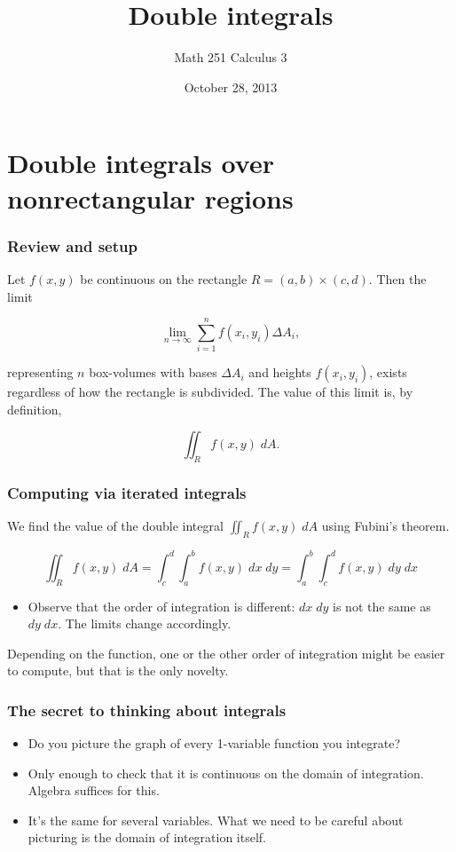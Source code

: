 \documentclass[11pt,ignorenonframetext,aspectratio=169,xcolor={svgnames}]{beamer}
\title{Double integrals}
\author{Math 251 Calculus 3}
\date{October 28, 2013}
\begin{document}
\frame{\titlepage}

\section{Double integrals over nonrectangular regions}

\begin{frame}\frametitle{Review and setup}

Let $f(x,y)$ be continuous on the rectangle $R = (a,b) \times (c,d)$.
Then the limit

\[ \lim_{n \to \infty} \sum_{i=1}^n f(x_i, y_i) \Delta A_i, \]

representing $n$ box-volumes with bases $\Delta A_i$ and heights
$f(x_i,y_i)$, exists regardless of how the rectangle is subdivided. The
value of this limit is, by definition,

\[ \iint_R f(x,y) \; dA. \]

\end{frame}

\begin{frame}\frametitle{Computing via iterated integrals}

We find the value of the double integral $\iint_R f(x,y) \; dA$ using
Fubini's theorem.

\[ \iint_R f(x,y) \; dA = \int_c^d \int_a^b f(x,y) \; dx \; dy = \int_a^b \int_c^d f(x,y) \; dy \; dx \]

\begin{itemize}

\item
  Observe that the order of integration is different: $dx \; dy$ is not
  the same as $dy \; dx$. The limits change accordingly.
\end{itemize}

Depending on the function, one or the other order of integration might
be easier to compute, but that is the only novelty.

\end{frame}

\begin{frame}\frametitle{The secret to thinking about integrals}

\begin{itemize}

\item
  Do you picture the graph of every 1-variable function you integrate?
\item
  Only enough to check that it is continuous on the domain of
  integration. Algebra suffices for this.
\item
  It's the same for several variables. What we need to be careful about
  picturing is the domain of integration itself.
\end{itemize}

\end{frame}
\end{document}
